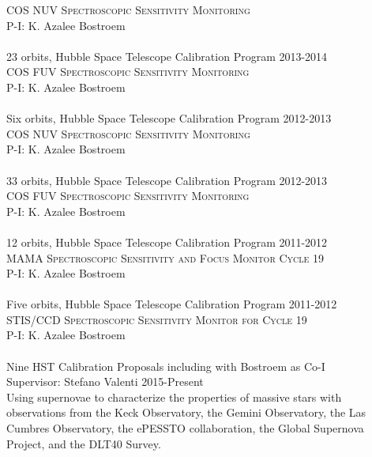 \documentclass[10pt]{cv}
\begin{document}
\begin{llist}
\textsc{COS NUV Spectroscopic Sensitivity Monitoring}\\
P-I: K. Azalee Bostroem \\
\\
23 orbits, Hubble Space Telescope Calibration Program \hfill 2013-2014\\ %
\textsc{COS FUV Spectroscopic Sensitivity Monitoring}\\
P-I: K. Azalee Bostroem \\
\\
Six orbits, Hubble Space Telescope Calibration Program \hfill 2012-2013\\ %
\textsc{COS NUV Spectroscopic Sensitivity Monitoring}\\
P-I: K. Azalee Bostroem \\
\\
33 orbits, Hubble Space Telescope Calibration Program \hfill 2012-2013\\ %
\textsc{COS FUV Spectroscopic Sensitivity Monitoring}\\
P-I: K. Azalee Bostroem \\
\\
12 orbits, Hubble Space Telescope Calibration Program \hfill 2011-2012\\ %
\textsc{MAMA Spectroscopic Sensitivity and Focus Monitor Cycle 19}\\
P-I: K. Azalee Bostroem \\
\\
Five orbits, Hubble Space Telescope Calibration Program \hfill 2011-2012\\ %
\textsc{STIS/CCD Spectroscopic Sensitivity Monitor for Cycle 19}\\
P-I: K. Azalee Bostroem \\
\\
Nine HST Calibration Proposals including with Bostroem as Co-I\\ %
%
\vspace{-0.1in}   
Supervisor: Stefano Valenti \hfill 2015-Present\\
Using supernovae to characterize the properties of massive stars with 
observations from the Keck Observatory, the Gemini Observatory, the 
Las Cumbres Observatory, the ePESSTO collaboration, the Global 
Supernova Project, and the DLT40 Survey.\\

\end{llist}
\end{document}
